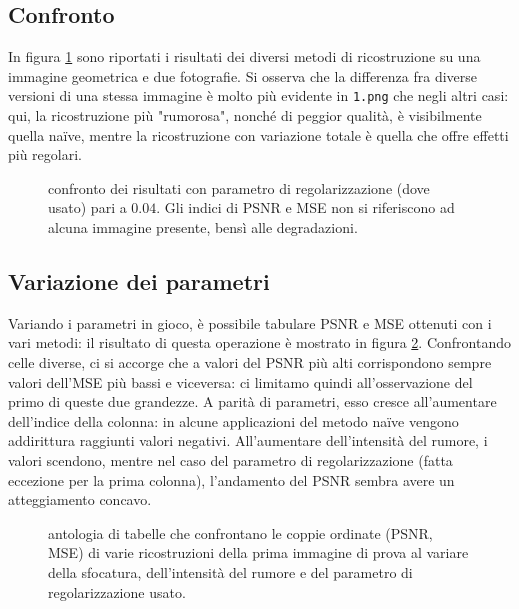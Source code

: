 \documentclass[a4paper]{article}
\begin{document}
\subsection{Confronto}
In figura \ref{fig:comparison} sono riportati i risultati dei diversi metodi di
ricostruzione su una immagine geometrica e due fotografie.
Si osserva che la differenza fra diverse versioni di una stessa immagine è molto
più evidente in \verb!1.png! che negli altri casi: qui, la ricostruzione più
"rumorosa", nonché di peggior qualità, è visibilmente quella naïve, mentre la
ricostruzione con variazione totale è quella che offre effetti più regolari.
\begin{figure}
  \begin{center}
    \vspace*{-1.1in}
    \centerline{\scalebox{1.3}{}}
  \end{center}
  \vspace*{-0.2in}
  \caption{confronto dei risultati con parametro di regolarizzazione (dove
  usato) pari a $0.04$. Gli indici di PSNR e MSE non si riferiscono ad alcuna
  immagine presente, bensì alle degradazioni.}
  \label{fig:comparison}
\end{figure}

\subsection{Variazione dei parametri}
Variando i parametri in gioco, è possibile tabulare PSNR e MSE ottenuti con i
vari metodi: il risultato di questa operazione è mostrato in figura
\ref{fig:parameters}.
Confrontando celle diverse, ci si accorge che a valori del PSNR più alti
corrispondono sempre valori dell'MSE più bassi e viceversa: ci limitamo quindi
all'osservazione del primo di queste due grandezze. A parità di parametri, esso
cresce all'aumentare dell'indice della colonna: in alcune applicazioni del
metodo naïve vengono addirittura raggiunti valori negativi. All'aumentare
dell'intensità del rumore, i valori scendono, mentre nel caso del parametro di
regolarizzazione (fatta eccezione per la prima colonna), l'andamento del PSNR
sembra avere un atteggiamento concavo.
\begin{figure}
  \begin{center}
    \scalebox{0.65}{}
  \end{center}
  \begin{center}
    \scalebox{0.65}{}
  \end{center}
  \begin{center}
    \scalebox{0.65}{}
  \end{center}
  \caption{antologia di tabelle che confrontano le coppie ordinate (PSNR, MSE)
  di varie ricostruzioni della prima immagine di prova al variare della
  sfocatura, dell'intensità del rumore e del parametro di regolarizzazione
  usato.}
  \label{fig:parameters}
\end{figure}
\end{document}

